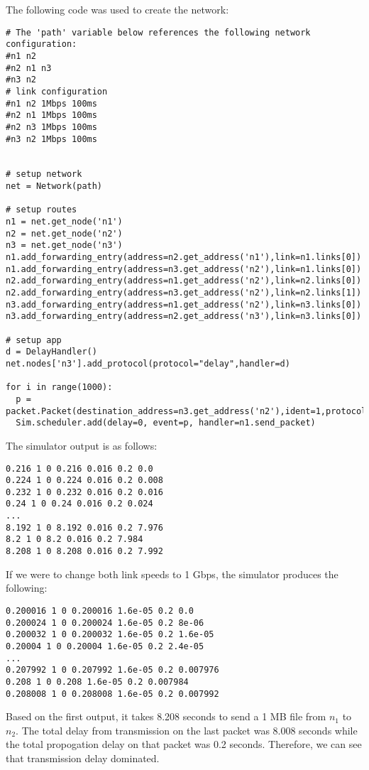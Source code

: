 \documentclass[11pt]{article}
\begin{document}
\begin{description}
\begin{description}
\medskip

The following code was used to create the network:

\medskip

\begin{lstlisting}
# The 'path' variable below references the following network configuration:
#n1 n2
#n2 n1 n3
#n3 n2
# link configuration
#n1 n2 1Mbps 100ms
#n2 n1 1Mbps 100ms
#n2 n3 1Mbps 100ms
#n3 n2 1Mbps 100ms


# setup network
net = Network(path)

# setup routes
n1 = net.get_node('n1')
n2 = net.get_node('n2')
n3 = net.get_node('n3')
n1.add_forwarding_entry(address=n2.get_address('n1'),link=n1.links[0])
n1.add_forwarding_entry(address=n3.get_address('n2'),link=n1.links[0])
n2.add_forwarding_entry(address=n1.get_address('n2'),link=n2.links[0])
n2.add_forwarding_entry(address=n3.get_address('n2'),link=n2.links[1])
n3.add_forwarding_entry(address=n1.get_address('n2'),link=n3.links[0])
n3.add_forwarding_entry(address=n2.get_address('n3'),link=n3.links[0])

# setup app
d = DelayHandler()
net.nodes['n3'].add_protocol(protocol="delay",handler=d)

for i in range(1000):
  p = packet.Packet(destination_address=n3.get_address('n2'),ident=1,protocol='delay',length=1000)
  Sim.scheduler.add(delay=0, event=p, handler=n1.send_packet)
\end{lstlisting}

The simulator output is as follows:

\begin{lstlisting}
0.216 1 0 0.216 0.016 0.2 0.0
0.224 1 0 0.224 0.016 0.2 0.008
0.232 1 0 0.232 0.016 0.2 0.016
0.24 1 0 0.24 0.016 0.2 0.024
...
8.192 1 0 8.192 0.016 0.2 7.976
8.2 1 0 8.2 0.016 0.2 7.984
8.208 1 0 8.208 0.016 0.2 7.992
\end{lstlisting}

If we were to change both link speeds to 1 Gbps, the simulator produces the following:

\begin{lstlisting}
0.200016 1 0 0.200016 1.6e-05 0.2 0.0
0.200024 1 0 0.200024 1.6e-05 0.2 8e-06
0.200032 1 0 0.200032 1.6e-05 0.2 1.6e-05
0.20004 1 0 0.20004 1.6e-05 0.2 2.4e-05
...
0.207992 1 0 0.207992 1.6e-05 0.2 0.007976
0.208 1 0 0.208 1.6e-05 0.2 0.007984
0.208008 1 0 0.208008 1.6e-05 0.2 0.007992
\end{lstlisting}

Based on the first output, it takes 8.208 seconds to send a 1 MB file from $n_1$ to $n_2$. The total delay from transmission on the last packet was 8.008 seconds while the total propogation delay on that packet was 0.2 seconds. Therefore, we can see that transmission delay dominated.


\end{description}
\end{description}
\end{document}
